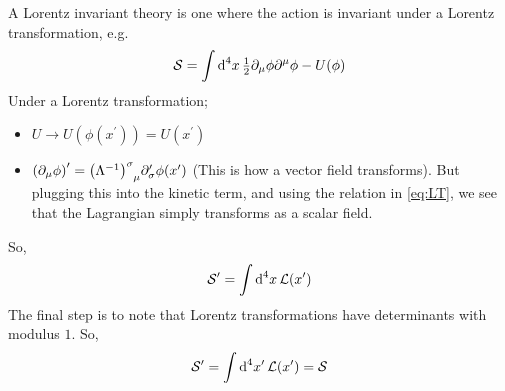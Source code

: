 \paraskip
A Lorentz invariant theory is one where the action is invariant under a Lorentz transformation, e.g.
\begin{equation*}
\mathcal{S} = \int{\text{d}^4 x \, \tfrac{1}{2}\partial_\mu \phi \partial^\mu \phi - U(\phi)}
\end{equation*}
Under a Lorentz transformation;
\begin{itemize}
\item $U \rightarrow U\left(\phi(x^{\prime})\right) = U(x^{\prime})$
\item $\left(\del_\mu \phi\right)^{\prime} = \left(\Lambda^{-1}\right)\indices{^\sigma_\mu} \del^{\prime}_\sigma \phi(x^{\prime})$ (This is how a vector field transforms). But plugging this into the kinetic term, and using the relation in \eqref{eq:LT}, we see that the Lagrangian simply transforms as a scalar field.
\end{itemize}
So,
$$\mathcal{S}^{\prime} = \int{\text{d}^4 x \, \mathcal{L}(x^{\prime})}$$
The final step is to note that Lorentz transformations have determinants with modulus $1$. So,
\begin{equation}
\mathcal{S}^{\prime} = \int{\text{d}^4 x^{\prime} \, \mathcal{L}(x^{\prime})} = \mathcal{S}
\end{equation}
